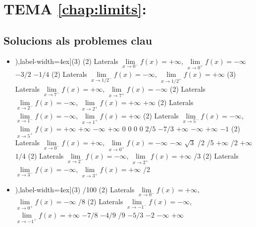 \section*{TEMA \ref{chap:limits}: }
\subsection*{Solucions als problemes clau \simbolclau}

\begin{itemize}
	
\item[\clauref{lim:fitxa1}] 
\begin{tasks}[counter-format=(tsk[1]),label-width=4ex](3)
	\task*(2) Laterals $\mathop{lim}\limits_{x\to 0^- } f(x)=+\infty$, $\mathop{lim}\limits_{x\to 0^+ } f(x)=-\infty$
	\task $-3/2$
	\task $-1/4$\startnewitemline
	\task*(2) Laterals $\mathop{lim}\limits_{x\to 1/2^- } f(x)=-\infty$, $\mathop{lim}\limits_{x\to 1/2^+ } f(x)=+\infty$
	\startnewitemline
	\task*(3) Laterals $\mathop{lim}\limits_{x\to 7^- } f(x)=+\infty$, $\mathop{lim}\limits_{x\to 7^+ } f(x)=-\infty$
	\task*(2) Laterals $\mathop{lim}\limits_{x\to 2^- } f(x)=-\infty$, $\mathop{lim}\limits_{x\to 2^+ } f(x)=+\infty$
	\task $+\infty$\startnewitemline
	\task*(2) Laterals $\mathop{lim}\limits_{x\to 1^- } f(x)=-\infty$, $\mathop{lim}\limits_{x\to 1^+ } f(x)=+\infty$
	\startnewitemline
	\task*(2) Laterals $\mathop{lim}\limits_{x\to 5^- } f(x)=-\infty$, $\mathop{lim}\limits_{x\to 5^+ } f(x)=+\infty$
	\task $+\infty$
	\task $-\infty$
	\task $+\infty$
	\task $0$
	\task $0$
	\task $0$
	\task $0$
	\task $2/5$
	\task $-7/3$
	\task $+\infty$
	\task $-\infty$
	\task $+\infty$
	\task $-1$
	\task*(2) Laterals $\mathop{lim}\limits_{x\to 0^- } f(x)=+\infty$, $\mathop{lim}\limits_{x\to 0^+ } f(x)=-\infty$
	\task $-\infty$
	\task $\sqrt{3}$
	/2
	/5
	\task $+\infty$
	/2
	\task $+\infty$
	\task $1/4$\startnewitemline
	\task*(2) Laterals $\mathop{lim}\limits_{x\to 2^- } f(x)=-\infty$, $\mathop{lim}\limits_{x\to 2^+ } f(x)=+\infty$
	/3\startnewitemline
	\task*(2) Laterals $\mathop{lim}\limits_{x\to 3^- } f(x)=-\infty$, $\mathop{lim}\limits_{x\to 3^+ } f(x)=+\infty$
	/2
\end{tasks}

\item[\clauref{lim:fitxa2}] 
\begin{tasks}[counter-format=(tsk[1]),label-width=4ex](3)
	/100
	\task*(2) Laterals  $\mathop{lim}\limits_{x\to 0^- } f(x)=+\infty$, $\mathop{lim}\limits_{x\to 0^+ } f(x)=-\infty$
	/8
	\task*(2) Laterals  $\mathop{lim}\limits_{x\to -1^- } f(x)=-\infty$, $\mathop{lim}\limits_{x\to -1^+ } f(x)=+\infty$
	\task $-7/8$
	\task $-4/9$
	/9
	\task $-5/3$
	\task $-2$
	\task $-\infty$
	\task $+\infty$	
\end{tasks}
\end{itemize}

